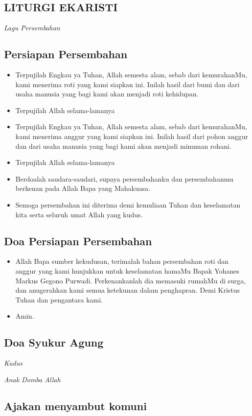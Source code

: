 \documentclass[10pt,landscape]{article}
\makeatletter
\newcommand{\lagu}[1]{%
  {\parindent \z@ 
    \interlinepenalty\@M \slshape \mdseries \large \textit{#1}\par\nobreak \vskip 10\p@ }}
\newcommand{\BU}[1]{\begin{itemize} \item[U:] #1 \end{itemize}}
\newcommand{\BI}[1]{\begin{itemize} \item[I:] #1 \end{itemize}}
\newcommand{\namaalm}{Bapak Yohanes Markus Gegono Purwadi}
\makeatother
\begin{document}
\begin{multicols}{3}
\section*{LITURGI EKARISTI}

\lagu{Lagu Persembahan}
\subsection*{Persiapan Persembahan}

\BI{Terpujilah Engkau ya Tuhan, Allah semesta alam, sebab dari kemurahanMu, kami menerima roti yang kami siapkan ini. Inilah hasil dari bumi dan dari usaha manusia yang bagi kami akan menjadi roti kehidupan.}

\BU{Terpujilah Allah selama-lamanya}

\BI{Terpujilah Engkau ya Tuhan, Allah semesta alam, sebab dari kemurahanMu, kami menerima anggur yang kami siapkan ini. Inilah hasil dari pohon anggur dan dari usaha manusia yang bagi kami akan menjadi minuman rohani.}

\BU{Terpujilah Allah selama-lamanya}

\BI{Berdoalah saudara-saudari, supaya persembahanku dan persembahanmu berkenan pada Allah Bapa yang Mahakuasa.}

\BU{Semoga persembahan ini diterima demi kemuliaan Tuhan dan keselamatan kita serta seluruh umat Allah yang kudus.}

\subsection*{Doa Persiapan Persembahan}

\BI{Allah Bapa sumber kekudusan, terimalah bahan persembahan roti dan anggur yang kami hunjukkan untuk keselamatan hamaMu \namaalm. Perkenankanlah dia memasuki rumahMu di surga, dan anugerahkan kami semua ketekunan dalam penghapran. Demi Kristus Tuhan dan pengantara kami.}

\BU{Amin.}


\subsection*{Doa Syukur Agung}

\lagu{Kudus}

\lagu{Anak Domba Allah}

\subsection*{Ajakan menyambut komuni}


\end{multicols}
\end{document}
